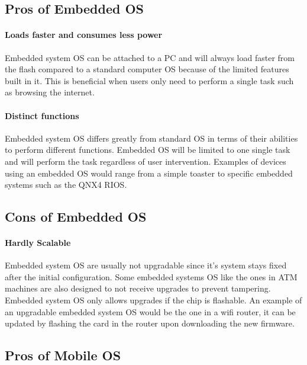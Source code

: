 \documentclass[conference]{IEEEtran}
\begin{document}
\subsection{Pros of Embedded OS}
\paragraph{Loads faster and consumes less power} %
Embedded system OS can be attached to a PC and will always load faster from the flash compared to a standard computer OS because of the limited features built in it. This is beneficial when users only need to perform a single task such as browsing the internet.\cite{TDDBM}

\paragraph{Distinct functions} %
Embedded system OS differs greatly from standard OS in terms of their abilities to perform different functions. Embedded OS will be limited to one single task and will perform the task regardless of user intervention. Examples of devices using an embedded OS would range from a simple toaster to specific embedded systems such as the QNX4 RIOS\cite{NOSvsEOS}.

\subsection{Cons of Embedded OS}
\paragraph{Hardly Scalable} %
Embedded system OS are usually not upgradable since it's system stays fixed after the initial configuration. Some embedded systems OS like the ones in  ATM machines are also designed to not receive upgrades to prevent tampering. Embedded system OS only allows upgrades if the chip is flashable. An example of an upgradable embedded system OS would be the one in a wifi router, it can be updated by flashing the card in the router upon downloading the new firmware\cite{lifewire}.

\subsection{Pros of Mobile OS}
\end{document}
